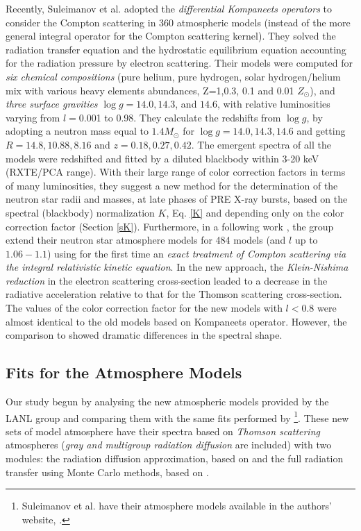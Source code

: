 { Recently, Suleimanov et al. \cite{SPW10} adopted the {\it differential Kompaneets operators} to consider the Compton scattering in  360 atmospheric models (instead of the more general integral operator for the Compton scattering kernel).  They solved the radiation transfer equation and the hydrostatic equilibrium equation accounting for the radiation pressure by electron scattering. Their  models were computed for {\it six chemical compositions} (pure helium, pure hydrogen, solar hydrogen/helium mix with various heavy elements abundances, Z=1,0.3, 0.1 and 0.01 $Z_{\odot}$), and {\it three surface gravities} $\log g = 14.0, 14.3$, and $14.6$,   with  relative luminosities varying from $l=$0.001 to 0.98. They calculate the redshifts from $\log g$, by  adopting a neutron mass equal to $1.4 M_{\odot}$ for $\log g=14.0, 14.3, 14.6$ and getting $R=14.8, 10.88, 8.16$ and $z=0.18, 0.27,0.42$.  The emergent spectra of all the  models were redshifted and fitted by a diluted blackbody within 3-20 keV (RXTE/PCA range). With their large range of  color correction factors in terms of many luminosities, they suggest a new method for the determination of the neutron star radii and masses, at late phases of PRE X-ray bursts, based on the spectral (blackbody) normalization $K$, Eq. \ref{K} and  depending only on the color correction factor (Section \ref{sK}). Furthermore, in a following work \cite{SPW12}, the group extend their neutron star atmosphere models for 484 models (and $l$ up to $1.06-1.1$) using for the first time an {\it exact treatment of Compton scattering via the integral relativistic kinetic equation}.  In the new approach, the {\it Klein-Nishima reduction} in the electron scattering cross-section leaded to a decrease in the radiative acceleration relative to that for the Thomson scattering cross-section.  The values of the color correction factor for the new models with $l<0.8$ were almost identical to the old models based on Kompaneets operator. However, the comparison to  \cite{MAD04} showed dramatic differences in the spectral shape.

\quad



\subsection{Fits for the Atmosphere Models}

Our study begun by analysing the new atmospheric models provided by the LANL group   and comparing them with  the same fits performed by  \cite{SPW10}\footnote{Suleimanov et al. have their atmosphere models available in the authors' website, \cite{SPWWEB}.}. These new sets of model atmosphere have their spectra based on {\it Thomson scattering} atmospheres ({\it gray and multigroup radiation diffusion} are included) with two modules: the radiation diffusion approximation, based on \cite{FLE71} and the full radiation transfer using Monte Carlo methods, based on \cite{WIN95}.

}
